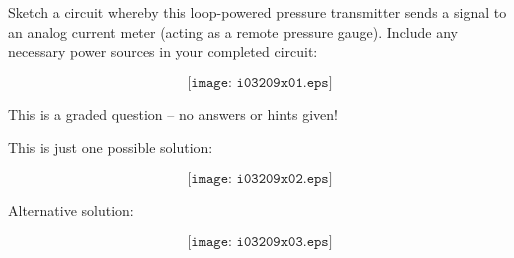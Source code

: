 

Sketch a circuit whereby this loop-powered pressure transmitter sends a signal to an analog current meter (acting as a remote pressure gauge).  Include any necessary power sources in your completed circuit:

\vskip 50pt

$$\texttt{[image: i03209x01.eps]}$$

\vfil 

\eject






This is a graded question -- no answers or hints given!







This is just one possible solution:

$$\texttt{[image: i03209x02.eps]}$$

Alternative solution:

$$\texttt{[image: i03209x03.eps]}$$




